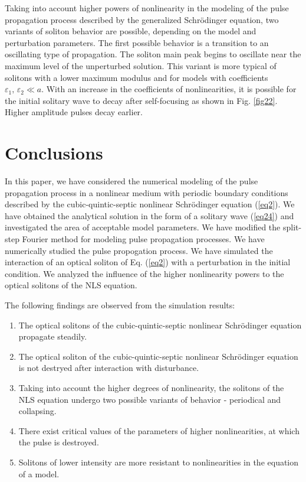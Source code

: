\documentclass[preprint,12pt]{elsarticle}
\begin{document}
Taking into account higher powers of nonlinearity in the modeling of the pulse propagation process described by the generalized Schr\"{o}dinger equation, two variants of soliton behavior are possible, depending on the model and perturbation parameters. The first possible behavior is a transition to an oscillating type of propagation. The soliton main peak begins to oscillate near the maximum level of the unperturbed solution. This variant is more typical of solitons with a lower maximum modulus and for models with coefficients \(\varepsilon_{1},\,\varepsilon_{2} \ll a\). With an increase in the coefficients of nonlinearities, it is possible for the initial solitary wave to decay after self-focusing as shown in Fig. \ref{fig22}. Higher amplitude pulses decay earlier.

\section{Conclusions}\label{ch11}
In this paper, we have considered the numerical modeling of the pulse propagation process in a nonlinear medium with periodic boundary conditions described by the cubic-quintic-septic nonlinear Schr\"{o}dinger equation (\ref{eq2}). We have obtained the analytical solution in the form of a solitary wave (\ref{eq24}) and investigated the area of acceptable model parameters. We have modified the split-step Fourier method for modeling pulse propagation processes. We have numerically studied the pulse propogation process. We have simulated the interaction of an optical soliton of Eq. (\ref{eq2}) with a perturbation in the initial condition. We analyzed the influence of the higher nonlinearity powers to the optical solitons of the NLS equation. 

The following findings are observed from the simulation results:
\begin{enumerate}
  \setlength\itemsep{1em}
  \item The optical solitons of the cubic-quintic-septic nonlinear Schr\"{o}dinger equation propagate steadily.
  \item The optical soliton of the cubic-quintic-septic nonlinear Schr\"{o}dinger equation is not destryed after interaction with disturbance.
  \item Taking into account the higher degrees of nonlinearity, the solitons of the NLS equation undergo two possible variants of behavior - periodical and collapsing.
  \item There exist critical values of the parameters of higher nonlinearities, at which the pulse is destroyed.
  \item Solitons of lower intensity are more resistant to nonlinearities in the equation of a model.
\end{enumerate}
\end{document}
